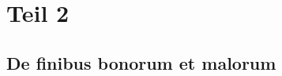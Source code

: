 %
%
%
%
\section{Teil 2 
\label{mongeampere:section:teil2}}

\subsection{De finibus bonorum et malorum
\label{mongeampere:subsection:bonorum}}


